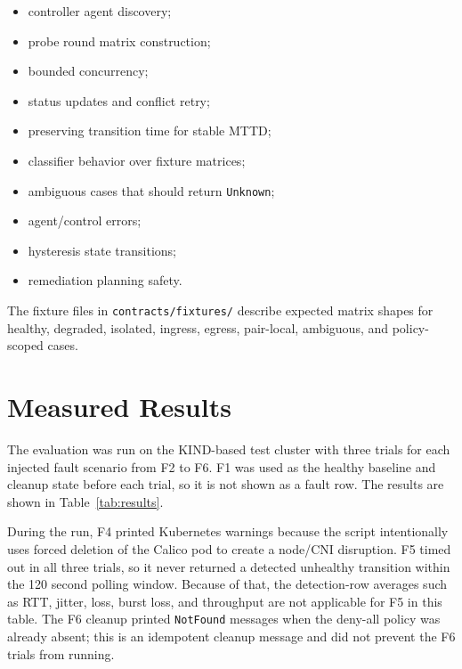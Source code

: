 \documentclass[11pt,a4paper]{article}
\newcommand{\code}[1]{\texttt{#1}}
\begin{document}
\begin{itemize}
  \item controller agent discovery;
  \item probe round matrix construction;
  \item bounded concurrency;
  \item status updates and conflict retry;
  \item preserving transition time for stable MTTD;
  \item classifier behavior over fixture matrices;
  \item ambiguous cases that should return \code{Unknown};
  \item agent/control errors;
  \item hysteresis state transitions;
  \item remediation planning safety.
\end{itemize}

The fixture files in \code{contracts/fixtures/} describe expected matrix shapes for healthy, degraded, isolated, ingress, egress, pair-local, ambiguous, and policy-scoped cases.

\section{Measured Results}

The evaluation was run on the KIND-based test cluster with three trials for each injected fault scenario from F2 to F6. F1 was used as the healthy baseline and cleanup state before each trial, so it is not shown as a fault row. The results are shown in Table~\ref{tab:results}.

During the run, F4 printed Kubernetes warnings because the script intentionally uses forced deletion of the Calico pod to create a node/CNI disruption. F5 timed out in all three trials, so it never returned a detected unhealthy transition within the 120 second polling window. Because of that, the detection-row averages such as RTT, jitter, loss, burst loss, and throughput are not applicable for F5 in this table. The F6 cleanup printed \code{NotFound} messages when the deny-all policy was already absent; this is an idempotent cleanup message and did not prevent the F6 trials from running.
\end{document}
